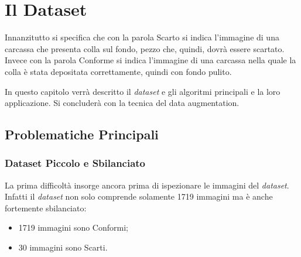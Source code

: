 
\chapter{Il Dataset}

Innanzitutto si specifica che con la parola Scarto si indica l'immagine di una carcassa che presenta colla sul fondo, pezzo che, quindi, dovrà essere scartato.
Invece con la parola Conforme si indica l'immagine di una carcassa nella quale la colla è stata depositata correttamente, quindi con fondo pulito.

In questo capitolo verrà descritto il \textit{dataset} e gli algoritmi principali e la loro applicazione.
Si concluderà con la tecnica del data augmentation.


\section{Problematiche Principali}

\subsection{Dataset Piccolo e Sbilanciato}
La prima difficoltà insorge ancora prima di ispezionare le immagini del \textit{dataset}.
Infatti il \textit{dataset} non solo comprende solamente 1719 immagini ma è anche fortemente sbilanciato:
\begin{itemize}
    \item 1719 immagini sono Conformi;
    \item 30 immagini sono Scarti.
\end{itemize}

